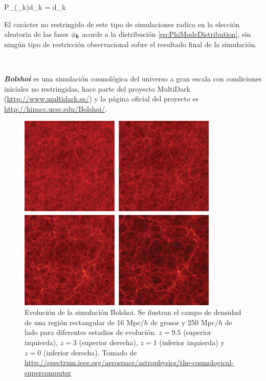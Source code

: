 { P_\phi(\phi_{\bds k})d\phi_{\bds k} = d\phi_{\bds k} }


El carácter no restringido de este tipo de simulaciones radica en la 
elección aleatoria de las fases $\phi_{\boldsymbol{ k }}$ acorde a la distribución
\ref{eq:PhiModeDistribution}, sin ningún tipo de restricción observacional
sobre el resultado final de la simulación.

\

\textbf{\textit{Bolshoi}} es una simulación cosmológica del universo 
a gran escala con condiciones iniciales no restringidas, hace 
parte del proyecto MultiDark (\url{http://www.multidark.es/}) y la página 
oficial del proyecto es \url{http://hipacc.ucsc.edu/Bolshoi/}. 

\newpage
\begin{figure}[htbp]
	\centering
	\includegraphics[width=0.85\textwidth]
	{./figures/3_nbody_simulations/Bolshoi_Evolution.png}

	\caption{\small{Evolución de la simulación Bolshoi. Se ilustran el
	campo de densidad de una región rectangular de 16 Mpc$/h$ de grosor y 
	250 Mpc$/h$	de lado para diferentes estadios de evolución. $z=9.5$ 
	(superior izquierda), $z=3$ (superior derecha), $z=1$ (inferior 
	izquierda) y $z=0$ (inferior derecha). Tomado de 
	\url{http://spectrum.ieee.org/aerospace/astrophysics/the-cosmological-supercomputer} }}
	
	\label{fig:Bolshoi_Evolution}
\end{figure}


